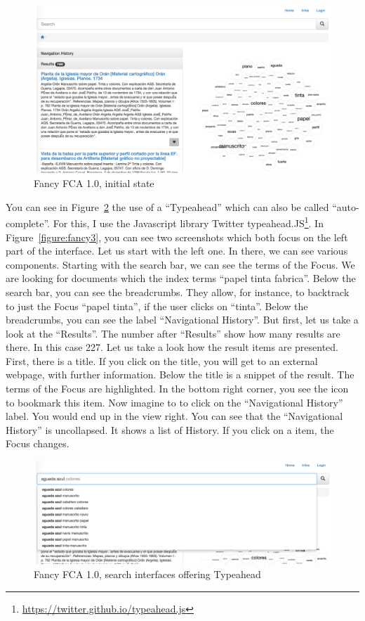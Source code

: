 \documentclass[11pt]{report}
\begin{document}
\begin{figure}[!ht]
	\centering
	\includegraphics[width=\linewidth]{images/fancy1}
\caption{Fancy FCA 1.0, initial state}
\label{figure:fancy1}
\end{figure}

 You can see in Figure~\ref{figure:fancy2} the use of a ``Typeahead'' which can also be called ``auto-complete''. For this, I use the Javascript library Twitter typeahead.JS\footnote{\url{https://twitter.github.io/typeahead.js}}. In Figure~\ref{figure:fancy3}, you can see two screenshots which both focus on the left part of the interface. Let us start with the left one. In there, we can see various components. Starting with the search bar, we can see the terms of the Focus. We are looking for documents which the index terms ``papel tinta fabrica''. Below the search bar, you can see the breadcrumbs. They allow, for instance, to backtrack to just the Focus ``papel tinta'', if the user clicks on ``tinta''. Below the breadcrumbs, you can see the label ``Navigational History''. But first, let us take a look at the ``Results''. The number after ``Results'' show how many results are there. In this case 227. Let us take a look how the result items are presented. First, there is a title. If you click on the title, you will get to an external webpage, with further information. Below the title is a snippet of the result. The terms of the Focus are highlighted. In the bottom right corner, you see the icon to bookmark this item. Now imagine to to click on the ``Navigational History'' label. You would end up in the view right. You can see that the ``Navigational History'' is uncollapsed. It shows a list of History. If you click on a item, the Focus changes. \\
 
\begin{figure}[!ht]
	\centering
	\includegraphics[width=\linewidth]{images/fancy2}
\caption{Fancy FCA 1.0, search interfaces offering Typeahead}
\label{figure:fancy2}
\end{figure}
\end{document}
